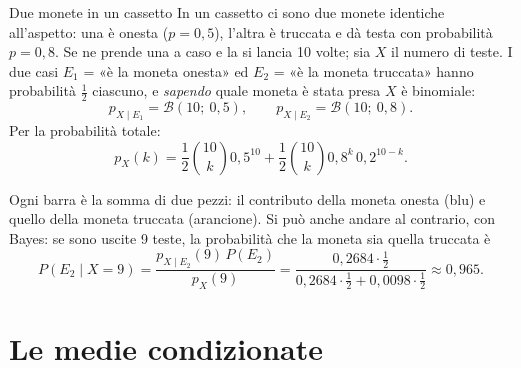 \begin{esempio}{Due monete in un cassetto}
In un cassetto ci sono due monete identiche all'aspetto: una è onesta ($p = 0{,}5$), l'altra è truccata e dà testa con
probabilità $p = 0{,}8$. Se ne prende una a caso e la si lancia 10 volte; sia $X$ il numero di teste. I due casi
$E_1$ = «è la moneta onesta» ed $E_2$ = «è la moneta truccata» hanno probabilità $\frac12$ ciascuno, e
\emph{sapendo} quale moneta è stata presa $X$ è binomiale:
\[ p_{X \mid E_1} = \mathcal{B}(10;\ 0{,}5) , \qquad p_{X \mid E_2} = \mathcal{B}(10;\ 0{,}8) . \]
Per la probabilità totale:
\[ p_X(k) = \frac12 \binom{10}{k} 0{,}5^{10} + \frac12 \binom{10}{k} 0{,}8^k\, 0{,}2^{10-k} . \]
\begin{center}
\end{center}
Ogni barra è la somma di due pezzi: il contributo della moneta onesta (blu) e quello della moneta truccata
(arancione). Si può anche andare al contrario, con Bayes: se sono uscite 9 teste, la probabilità che la moneta sia
quella truccata è
\[
  P(E_2 \mid X = 9) = \frac{p_{X \mid E_2}(9)\, P(E_2)}{p_X(9)} = \frac{0{,}2684 \cdot \frac12}{0{,}2684 \cdot \frac12 +
  0{,}0098 \cdot \frac12} \approx 0{,}965 .
\]
\end{esempio}

\section{Le medie condizionate}

